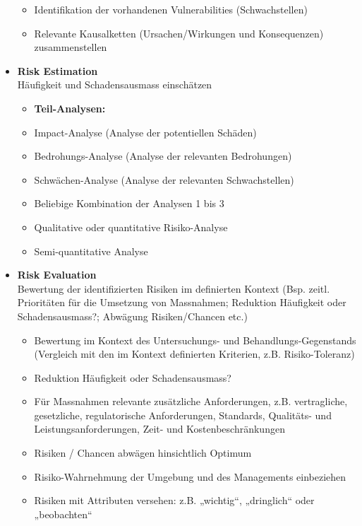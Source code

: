\documentclass[10pt,a4paper]{article}
\begin{document}
\begin{itemize}[noitemsep,topsep=0pt,leftmargin=*]
\begin{itemize}[noitemsep,topsep=0pt,leftmargin=*]
        \item Identifikation der vorhandenen Vulnerabilities (Schwachstellen)
        \item Relevante Kausalketten (Ursachen/Wirkungen und Konsequenzen) zusammenstellen
    \end{itemize}
    \item \textbf{Risk Estimation}\\Häufigkeit und Schadensausmass
    einschätzen
    \begin{itemize}[noitemsep,topsep=0pt,leftmargin=*]
        \item \textbf{Teil-Analysen:}
        \item Impact-Analyse (Analyse der potentiellen Schäden)
        \item Bedrohungs-Analyse (Analyse der relevanten Bedrohungen)
        \item Schwächen-Analyse (Analyse der relevanten Schwachstellen)
        \item Beliebige Kombination der Analysen 1 bis 3
        \item Qualitative oder quantitative Risiko-Analyse
        \item Semi-quantitative Analyse
    \end{itemize}
    \item \textbf{Risk Evaluation}\\Bewertung der identifizierten Risiken im
    definierten Kontext (Bsp. zeitl. Prioritäten für die
    Umsetzung von Massnahmen; Reduktion Häufigkeit oder
    Schadensausmass?; Abwägung Risiken/Chancen etc.)
    \begin{itemize}[noitemsep,topsep=0pt,leftmargin=*]
        \item Bewertung im Kontext des Untersuchungs- und Behandlungs-Gegenstands (Vergleich mit den im Kontext definierten Kriterien, z.B. Risiko-Toleranz)
        \item Reduktion Häufigkeit oder Schadensausmass?
        \item Für Massnahmen relevante zusätzliche Anforderungen, z.B. vertragliche, gesetzliche, regulatorische Anforderungen, Standards, Qualitäts- und Leistungsanforderungen, Zeit- und Kostenbeschränkungen
        \item Risiken / Chancen abwägen hinsichtlich Optimum
        \item Risiko-Wahrnehmung der Umgebung und des Managements einbeziehen
        \item Risiken mit Attributen versehen: z.B. „wichtig“, „dringlich“ oder „beobachten“

\end{itemize}
\end{itemize}
\end{document}
